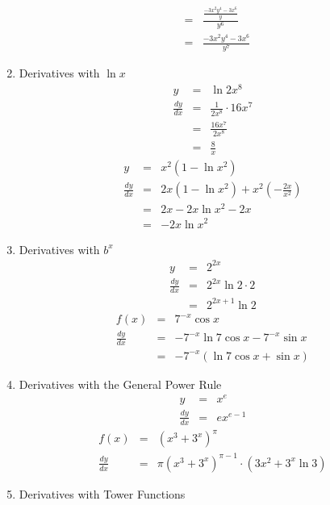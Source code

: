 \documentclass{article}
\begin{document}
\begin{enumerate}
\begin{eqnarray}
                          &=& \frac{\frac{-3x^2y^4 - 3x^6}{y}}{y^6} \\
                          &=& \frac{-3x^2y^4 - 3x^6}{y^7}
    \end{eqnarray}
    \item Derivatives with $\ln{x}$
    \begin{eqnarray}
        y &=& \ln{2x^8} \\
        \frac{dy}{dx} &=& \frac{1}{2x^8} \cdot 16x^7 \\
                      &=& \frac{16x^7}{2x^8} \\
                      &=& \frac{8}{x}
    \end{eqnarray}
    \begin{eqnarray}
        y &=& x^2\left(1 - \ln{x^2}\right) \\
        \frac{dy}{dx} &=& 2x\left(1 - \ln{x^2}\right) + x^2\left(- \frac{2x}{x^2}\right) \\
                      &=& 2x - 2x\ln{x^2} - 2x \\
                      &=& - 2x\ln{x^2}
    \end{eqnarray}
    \item Derivatives with $b^x$
    \begin{eqnarray}
        y &=& 2^{2x} \\
        \frac{dy}{dx} &=& 2^{2x}\ln{2} \cdot 2 \\
                      &=& 2^{2x + 1}\ln{2}
    \end{eqnarray}
    \begin{eqnarray}
        f(x) &=& 7^{-x}\cos{x} \\
        \frac{dy}{dx} &=& -7^{-x}\ln{7}\cos{x} - 7^{-x}\sin{x} \\
                      &=& -7^{-x}\left(\ln{7}\cos{x} + \sin{x}\right)
    \end{eqnarray}
    \item Derivatives with the General Power Rule
    \begin{eqnarray}
        y &=& x^e \\
        \frac{dy}{dx} &=& ex^{e - 1}
    \end{eqnarray}
    \begin{eqnarray}
        f(x) &=& \left(x^3 + 3^x\right)^\pi \\
        \frac{dy}{dx} &=& \pi\left(x^3 + 3^x\right)^{\pi - 1} \cdot \left(3x^2 + 3^x\ln{3}\right)
    \end{eqnarray}
    \item Derivatives with Tower Functions

\end{enumerate}
\end{document}
